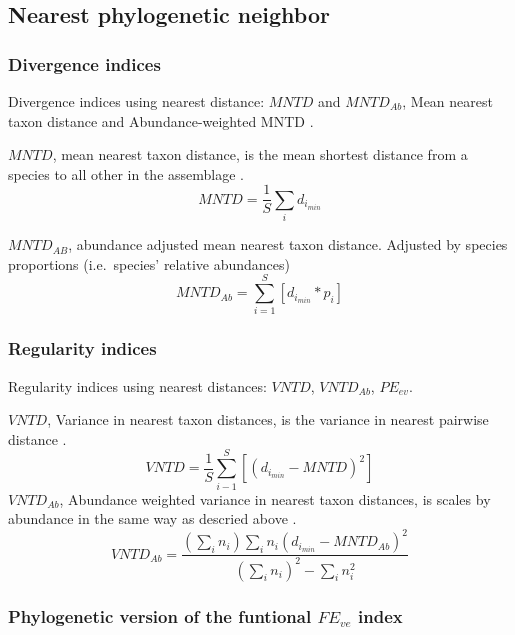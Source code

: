 \documentclass[]{book}
\theoremstyle{definition}
\theoremstyle{definition}
\theoremstyle{remark}
\begin{document}
\hypertarget{nearest-phylogenetic-neighbor}{\subsection{Nearest
phylogenetic neighbor}\label{nearest-phylogenetic-neighbor}}

\subsubsection{Divergence indices}\label{divergence-indices}

Divergence indices using nearest distance: \(MNTD\) and \(MNTD_{Ab}\),
Mean nearest taxon distance and Abundance-weighted MNTD
\citep{Webb2002, Webb2008, Kembel2010}.

\(MNTD\), mean nearest taxon distance, is the mean shortest distance
from a species to all other in the assemblage
\citep{Webb2002, Webb2008, Kembel2010}.\\
\[
MNTD = 
\dfrac{1}{S}
\sum_{i}
d_{i_{min}}
\]

\(MNTD_{AB}\), abundance adjusted mean nearest taxon distance. Adjusted
by species proportions (i.e.~species' relative abundances)
\citep{Webb2002, Webb2008, Kembel2010}\\
\[
MNTD_{Ab} = 
\sum_{i=1}^{S}
[d_{i_{min}} * p_{i}]
\]

\subsubsection{Regularity indices}\label{regularity-indices}

Regularity indices using nearest distances: \(VNTD\), \(VNTD_{Ab}\),
\(PE_{ev}\).

\(VNTD\), Variance in nearest taxon distances, is the variance in
nearest pairwise distance \citep{Tucker2016}. \[
VNTD = \dfrac{1}{S}
\sum_{i-1}^{S}
[(d_{i_{min}} - MNTD)^2]
\] \(VNTD_{Ab}\), Abundance weighted variance in nearest taxon
distances, is scales by abundance in the same way as descried above
\citep{Tucker2016}. \[
VNTD_{Ab} = \dfrac
{(\sum_{i} n_{i}) \sum_{i} n_{i} (d_{i_{min}} - MNTD_{Ab})^2}
{(\sum_{i} n_{i})^2 - \sum_{i} n_{i} ^2}
\]

\subsubsection{\texorpdfstring{Phylogenetic version of the funtional
\(FE_{ve}\)
index}{Phylogenetic version of the funtional FE\_\{ve\} index}}\label{phylogenetic-version-of-the-funtional-fe_ve-index}
\end{document}
